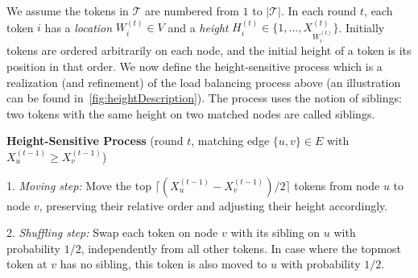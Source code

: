 \documentclass[twoside,leqno]{article}
\DeclareMathOperator{\1}{\mathbf{1}}
\numberwithin{equation}{section}
\begin{document}
We assume the tokens in $\mathcal{T}$ are numbered from $1$ to $|\mathcal{T}|$.
In each round $t$, each token $i$ has a \emph{location} $W_i^{(t)} \in V$ 
and a \emph{height} $H_i^{(t)} \in \{1, \dots, X^{(t)}_{W_i^{(t)}}\}$. Initially tokens are ordered arbitrarily on each node, and the initial height of a token is its position in that order. 
We now define the height-sensitive process which is a realization (and refinement) of the load balancing process above (an illustration can be found in~\cref{fig:heightDescription}). The process uses the notion of siblings: two tokens with the same height on two matched nodes are called siblings.

\medskip



\noindent%
\colorbox{black!10}{\minipage{\textwidth-2\fboxsep}%
\textbf{Height-Sensitive Process} (round $t$, matching edge $\{u,v\} \in E$ with $X_u^{(t-1)} \geq X_v^{(t-1)}$)
\smallskip

1. \emph{Moving step:} Move the top $\lceil (X_u^{(t-1)}-X_v^{(t-1)})/2\rceil$ tokens from node $u$ to node $v$, preserving their relative order and adjusting their height accordingly.
\smallskip


2. \emph{Shuffling step:}  Swap each token on node $v$ with its sibling on $u$ with probability $1/2$, independently from all other tokens. In case where the topmost token at $v$ has no sibling, this token is also moved to $u$ with probability $1/2$.
\endminipage}

\medskip
\end{document}
